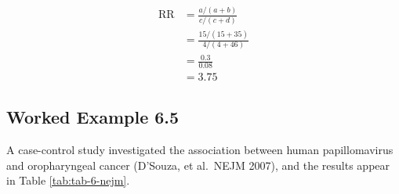 \documentclass[
]{memoir}
\begin{document}
\[
\begin{aligned}
\text{RR} &= \frac{a / (a+b)}{c / (c+d)} \\
  &= \frac{15 / (15+35)}{4 / (4+46)} \\
  &= \frac{0.3}{0.08} \\
  &= 3.75
\end{aligned}
\]

\hypertarget{worked-example-6.5}{%
\subsection{Worked Example 6.5}\label{worked-example-6.5}}

A case-control study investigated the association between human papillomavirus and oropharyngeal cancer (D'Souza, et al.~NEJM 2007), and the results appear in Table \ref{tab:tab-6-nejm}.

 
  \providecommand{\huxb}[2]{\arrayrulecolor[RGB]{#1}\global\arrayrulewidth=#2pt}
  \providecommand{\huxvb}[2]{\color[RGB]{#1}\vrule width #2pt}
  \providecommand{\huxtpad}[1]{\rule{0pt}{#1}}
  \providecommand{\huxbpad}[1]{\rule[-#1]{0pt}{#1}}
\end{document}
